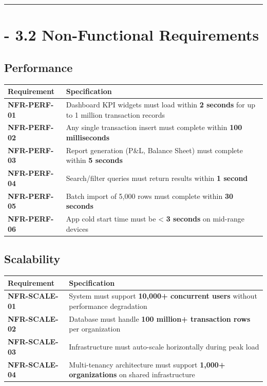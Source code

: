 \documentclass[journal, a4paper, onecolumn, 12pt]{IEEEtran}
\begin{document}
\vspace{1em}\hrule\vspace{1em}

\section{    - 3.2 Non-Functional Requirements}

\subsection{Performance}

\begin{longtable}{|p{}|p{}|}
\hline
Requirement & Specification \\ \hline
\hline
\textbf{NFR-PERF-01} & Dashboard KPI widgets must load within \textbf{2 seconds} for up to 1 million transaction records \\ \hline
\textbf{NFR-PERF-02} & Any single transaction insert must complete within \textbf{100 milliseconds} \\ \hline
\textbf{NFR-PERF-03} & Report generation (P\&L, Balance Sheet) must complete within \textbf{5 seconds} \\ \hline
\textbf{NFR-PERF-04} & Search/filter queries must return results within \textbf{1 second} \\ \hline
\textbf{NFR-PERF-05} & Batch import of 5,000 rows must complete within \textbf{30 seconds} \\ \hline
\textbf{NFR-PERF-06} & App cold start time must be < \textbf{3 seconds} on mid-range devices \\ \hline
\end{longtable}
\subsection{Scalability}

\begin{longtable}{|p{}|p{}|}
\hline
Requirement & Specification \\ \hline
\hline
\textbf{NFR-SCALE-01} & System must support \textbf{10,000+ concurrent users} without performance degradation \\ \hline
\textbf{NFR-SCALE-02} & Database must handle \textbf{100 million+ transaction rows} per organization \\ \hline
\textbf{NFR-SCALE-03} & Infrastructure must auto-scale horizontally during peak load \\ \hline
\textbf{NFR-SCALE-04} & Multi-tenancy architecture must support \textbf{1,000+ organizations} on shared infrastructure \\ \hline
\end{longtable}
\end{document}
